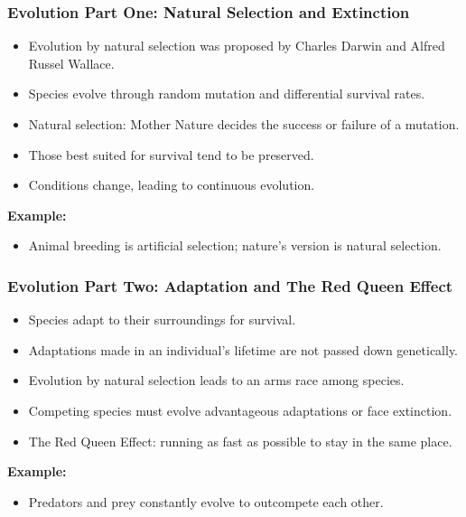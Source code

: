 \begin{frame}[fragile]\frametitle{Evolution Part One: Natural Selection and Extinction}
\begin{itemize}
    \item Evolution by natural selection was proposed by Charles Darwin and Alfred Russel Wallace.
    \item Species evolve through random mutation and differential survival rates.
    \item Natural selection: Mother Nature decides the success or failure of a mutation.
    \item Those best suited for survival tend to be preserved.
    \item Conditions change, leading to continuous evolution.
\end{itemize}
\textbf{Example:}
\begin{itemize}
    \item Animal breeding is artificial selection; nature's version is natural selection.
\end{itemize}
\end{frame}

\begin{frame}[fragile]\frametitle{Evolution Part Two: Adaptation and The Red Queen Effect}
\begin{itemize}
    \item Species adapt to their surroundings for survival.
    \item Adaptations made in an individual’s lifetime are not passed down genetically.
    \item Evolution by natural selection leads to an arms race among species.
    \item Competing species must evolve advantageous adaptations or face extinction.
    \item The Red Queen Effect: running as fast as possible to stay in the same place.
\end{itemize}
\textbf{Example:}
\begin{itemize}
    \item Predators and prey constantly evolve to outcompete each other.
\end{itemize}
\end{frame}

